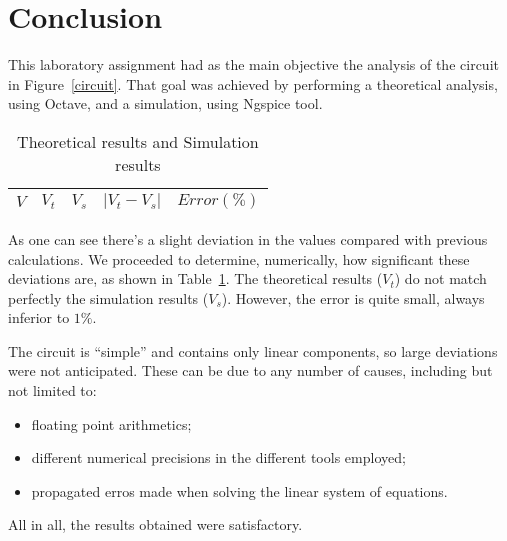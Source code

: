 \section{Conclusion}
\label{sec:conclusion}

This laboratory assignment had as the main objective the analysis of the circuit in Figure~\ref{circuit}. That goal was achieved by performing a theoretical analysis, using Octave, and a simulation, using Ngspice tool.

\begin{table}[H]
  \centering
  \begin{tabular}{|c|c|c|c|c|}
    \hline
        $V$ & $V_t$ & $V_s$ & $|V_t-V_s|$ & $Error (\%)$ \\
        \hline
        \hline
        
        \hline
  \end{tabular}
  \caption{Theoretical results and Simulation results}
  \label{error_res}
\end{table}

As one can see there's a slight deviation in the values compared with previous calculations. We proceeded to determine, numerically, how significant these deviations are, as shown in Table~\ref{error_res}. The theoretical results ($V_t$) do not match perfectly the simulation results ($V_s$). However, the error is quite small, always inferior to $1\%$.

The circuit is ``simple'' and contains only linear components, so large deviations were not anticipated. These can be due to any number of causes, including but not limited to:

\begin{itemize}
\item floating point arithmetics;
\item different numerical precisions in the different tools employed;
\item propagated erros made when solving the linear system of equations.
\end{itemize}



All in all, the results obtained were satisfactory.


